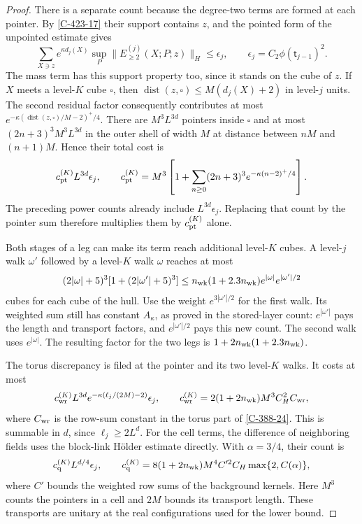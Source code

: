 \documentclass[11pt,letterpaper,reqno]{amsart}
\theoremstyle{definition}
\theoremstyle{remark}
\begin{document}
\begin{proof}
There is a separate count because the degree-two terms
are formed at each pointer. By \cref{C-423-17} their
support contains $z$, and the pointed form of the
unpointed estimate gives
\[
 \sum_{X\ni z}e^{\kappa d_j(X)}
       \sup_P\|E^{(j)}_{\ge2}(X;P;z)\|_H
        \le\epsilon_j,\qquad
 \epsilon_j=C_2\phi(\mathsf t_{j-1})^2.
\]
The mass term has this support property too, since it
stands on the cube of $z$. If $X$ meets a level-$K$ cube
$\square$, then
$\operatorname{dist}(z,\square)\le M(d_j(X)+2)$ in
level-$j$ units. The second residual factor consequently
contributes at most
$e^{-\kappa(\operatorname{dist}(z,\square)/M-2)^+/4}$.
There are $M^3L^{3d}$ pointers inside $\square$ and at
most $(2n+3)^3M^3L^{3d}$ in the outer shell of width $M$
at distance between $nM$ and $(n+1)M$. Hence their total
cost is
\[
 c_{\rm pt}^{(K)}L^{3d}\epsilon_j,\qquad
 c_{\rm pt}^{(K)}
 =M^3\left[1+\sum_{n\ge0}(2n+3)^3
                              e^{-\kappa(n-2)^+/4}\right].
\]
The preceding power counts already include
$L^{3d}\epsilon_j$. Replacing that count by the pointer sum
therefore multiplies them by $c_{\rm pt}^{(K)}$ alone.

Both stages of a leg can make its term reach additional
level-$K$ cubes. A level-$j$ walk $\omega'$ followed by
a level-$K$ walk $\omega$ reaches at most
\[
 (2|\omega|+5)^3[1+(2|\omega'|+5)^3]
 \le n_{\rm wk}(1+2.3n_{\rm wk})
                         e^{|\omega|}e^{|\omega'|/2}
\]
cubes for each cube of the hull. Use the weight
$e^{3|\omega'|/2}$ for the first walk. Its weighted sum
still has constant $A_\kappa$, as proved in the
stored-layer count: $e^{|\omega'|}$ pays the length and
transport factors, and $e^{|\omega'|/2}$ pays this new
count. The second walk uses $e^{|\omega|}$. The resulting
factor for the two legs is
$1+2n_{\rm wk}(1+2.3n_{\rm wk})$.

The torus discrepancy is filed at the pointer and its
two level-$K$ walks. It costs at most
\[
 c_{\rm wr}^{(K)}L^{3d}
           e^{-\kappa(\ell_j/(2M)-2)}\epsilon_j,
 \qquad
 c_{\rm wr}^{(K)}=2(1+2n_{\rm wk})M^3C_H^2C_{\rm wr},
\]
where $C_{\rm wr}$ is the row-sum constant in the torus
part of \cref{C-388-24}. This is summable in $d$, since
$\ell_j\ge2L^d$.
For the cell terms, the difference of neighboring fields
uses the block-link H\"older estimate directly. With
$\alpha=3/4$, their count is
\[
 c_{\rm q}^{(K)}L^{d/4}\epsilon_j,
 \qquad c_{\rm q}^{(K)}
 =8(1+2n_{\rm wk})M^4C'^2C_H\max\{2,C(\alpha)\},
\]
where $C'$ bounds the weighted row sums of the background
kernels. Here $M^3$ counts the pointers in a cell and
$2M$ bounds its transport length. These transports are
unitary at the real configurations used for the lower bound.


\end{proof}
\end{document}
